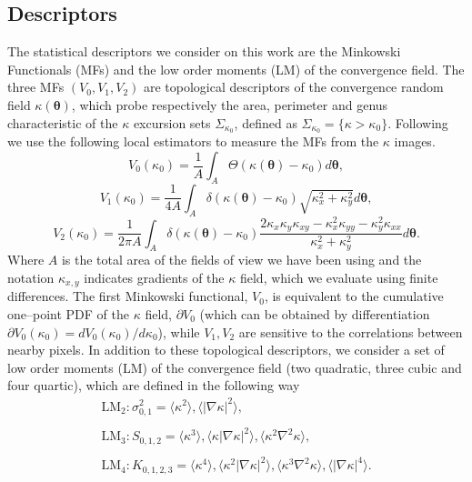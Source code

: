 \documentclass[reprint,aps,prd,superscriptaddress,showkeys,showpacs]{revtex4-1}
\begin{document}
\subsection{Descriptors}
The statistical descriptors we consider on this work are the Minkowski Functionals (MFs) and the low order moments (LM) of the convergence field. The three MFs $(V_0,V_1,V_2)$ are topological descriptors of the convergence random field $\kappa(\pmb{\theta})$, which probe respectively the area, perimeter and genus characteristic of the $\kappa$ excursion sets $\Sigma_{\kappa_0}$, defined as $\Sigma_{\kappa_0}=\{\kappa>\kappa_0\}$. Following \citep{Petri2013,MinkJan} we use the following local estimators to measure the MFs from the $\kappa$ images. 
%
\begin{equation*}
\label{v0meas}
V_0(\kappa_0)=\frac{1}{A}\int_A\Theta(\kappa(\pmb{\theta})-\kappa_0)d\pmb{\theta},
\end{equation*}
\begin{equation}
\label{v1meas}
V_1(\kappa_0)=\frac{1}{4A}\int_A\delta(\kappa(\pmb{\theta})-\kappa_0)\sqrt{\kappa_x^2+\kappa_y^2}d\pmb{\theta},
\end{equation}
\begin{equation*}
\label{v2meas}
V_2(\kappa_0)=\frac{1}{2\pi A}\int_A\delta(\kappa(\pmb{\theta})-\kappa_0)\frac{2\kappa_x\kappa_y\kappa_{xy}-\kappa_x^2\kappa_{yy}-\kappa_y^2\kappa_{xx}}{\kappa_x^2+\kappa_y^2}d\pmb{\theta}.
\end{equation*}
%
Where $A$ is the total area of the fields of view we have been using and the notation $\kappa_{x,y}$ indicates gradients of the $\kappa$ field, which we evaluate using finite differences. The first Minkowski functional, $V_0$, is equivalent to the cumulative one--point PDF of the $\kappa$ field, $\partial V_0$ (which can be obtained by differentiation $\partial V_0(\kappa_0)=dV_0(\kappa_0)/d\kappa_0$), while $V_1,V_2$ are sensitive to the correlations between nearby pixels. In addition to these topological descriptors, we consider a set of low order moments (LM) of the convergence field (two quadratic, three cubic and four quartic), which are defined in the following way
%
\begin{equation}
\label{momentestimator}
\begin{matrix}
\mathrm{LM_2}: \sigma_{0,1}^2 = \langle\kappa^2\rangle,\langle\vert\nabla\kappa\vert^2\rangle, \\ \\
\mathrm{LM_3}: S_{0,1,2} = \langle\kappa^3\rangle,\langle\kappa\vert\nabla\kappa\vert^2\rangle,\langle\kappa^2\nabla^2\kappa\rangle, \\ \\
\mathrm{LM_4}: K_{0,1,2,3} = \langle\kappa^4\rangle,\langle\kappa^2\vert\nabla\kappa\vert^2\rangle,\langle\kappa^3\nabla^2\kappa\rangle,\langle\vert\nabla\kappa\vert^4\rangle.
\end{matrix}
\end{equation}
\end{document}
